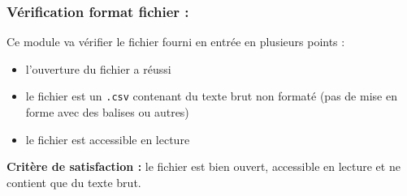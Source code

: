 			\subsubsection{Vérification format fichier :}
				Ce module va vérifier le fichier fourni en entrée en plusieurs points :
				\begin{itemize}
					\item l'ouverture du fichier a réussi
					\item le fichier est un \lstinline!.csv! contenant du texte brut non formaté (pas de mise en forme avec des balises ou autres)
					\item le fichier est accessible en lecture
				\end{itemize}
				\textbf{Critère de satisfaction : } le fichier est bien ouvert, accessible en lecture et ne contient que du texte brut.
			
